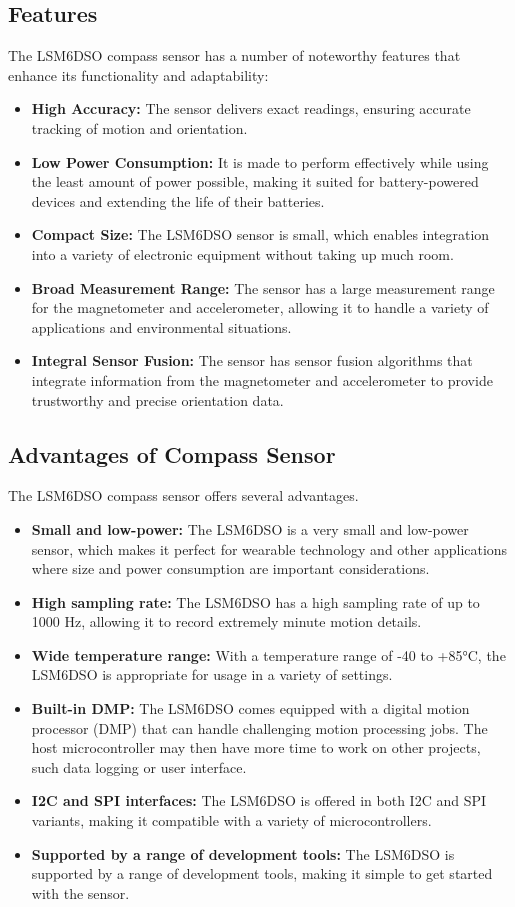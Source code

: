 \documentclass[
12pt,
oneside, 
onehalfspacing, 
nolistspacing, 
parskip, 
chapterinoneline, 
]{AASTCOMPUTER}
\begin{document}
\subsection{Features}
The LSM6DSO compass sensor has a number of noteworthy features that enhance its functionality and adaptability:

\begin{itemize}
  \item \textbf{High Accuracy:} The sensor delivers exact readings, ensuring accurate tracking of motion and orientation.
  \item \textbf{Low Power Consumption:} It is made to perform effectively while using the least amount of power possible, making it suited for battery-powered devices and extending the life of their batteries.
  \item \textbf{Compact Size:} The LSM6DSO sensor is small, which enables integration into a variety of electronic equipment without taking up much room.
  \item \textbf{Broad Measurement Range:} The sensor has a large measurement range for the magnetometer and accelerometer, allowing it to handle a variety of applications and environmental situations.
  \item \textbf{Integral Sensor Fusion:} The sensor has sensor fusion algorithms that integrate information from the magnetometer and accelerometer to provide trustworthy and precise orientation data.
\end{itemize}

\subsection{Advantages of Compass Sensor}
The LSM6DSO compass sensor offers several advantages.

\begin{itemize}
  \item \textbf{Small and low-power:} The LSM6DSO is a very small and low-power sensor, which makes it perfect for wearable technology and other applications where size and power consumption are important considerations.
  \item \textbf{High sampling rate:} The LSM6DSO has a high sampling rate of up to 1000 Hz, allowing it to record extremely minute motion details.
  \item \textbf{Wide temperature range:} With a temperature range of -40 to +85°C, the LSM6DSO is appropriate for usage in a variety of settings.
  \item \textbf{Built-in DMP:} The LSM6DSO comes equipped with a digital motion processor (DMP) that can handle challenging motion processing jobs. The host microcontroller may then have more time to work on other projects, such data logging or user interface.
  \item \textbf{I2C and SPI interfaces:} The LSM6DSO is offered in both I2C and SPI variants, making it compatible with a variety of microcontrollers.
  \item \textbf{Supported by a range of development tools:} The LSM6DSO is supported by a range of development tools, making it simple to get started with the sensor.
\end{itemize}
\end{document}
